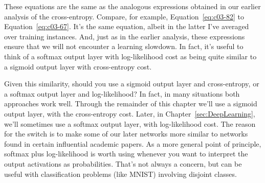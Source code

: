 These equations are the same as the analogous expressions obtained in our earlier analysis of the cross-entropy. Compare, for example, Equation~\ref{eq:c03-82} to Equation~\ref{eq:c03-67}. It's the same equation, albeit in the latter I've averaged over training instances. And, just as in the earlier analysis, these expressions ensure that we will not encounter a learning slowdown. In fact, it's useful to think of a softmax output layer with log-likelihood cost as being quite similar to a sigmoid output layer with cross-entropy cost.

Given this similarity, should you use a sigmoid output layer and cross-entropy, or a softmax output layer and log-likelihood? In fact, in many situations both approaches work well. Through the remainder of this chapter we'll use a sigmoid output layer, with the cross-entropy cost. Later, in Chapter~\ref{sec:DeepLearning}, we'll sometimes use a softmax output layer, with log-likelihood cost. The reason for the switch is to make some of our later networks more similar to networks found in certain influential academic papers. As a more general point of principle, softmax plus log-likelihood is worth using whenever you want to interpret the output activations as probabilities. That's not always a concern, but can be useful with classification problems (like MNIST) involving disjoint classes.



